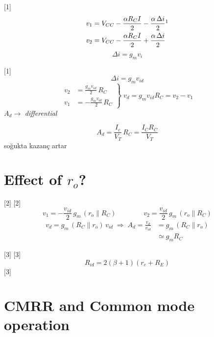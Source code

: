 \documentclass[11pt,a4paper]{article}
\begin{document}


[1]
\begin{align*}
v_1 &= V_{CC} - \frac{\alpha R_C I}{2} - \frac{\alpha\,\Delta i}{2}\footnotemark \\
v_2 &= V_{CC} - \frac{\alpha R_C I}{2} + \frac{\alpha\,\Delta i}{2}
\end{align*}
\[ \Delta i = g_m v_i \]

[1]
\[ \Delta i = g_m v_{id} \]
\[ \left.\begin{aligned} v_2 &= \frac{g_m v_{id}}{2}\,R_C \\ v_1 &= -\frac{g_m v_{id}}{2}\,R_C \end{aligned}\right\} \; v_d = g_m v_{id} R_C = v_2 - v_1 \]
$A_d \rightarrow$ \textit{differential}


\[ A_d = \frac{I_c}{V_T}\,R_C = \frac{I_C R_C}{V_T} \]
soğukta kazanç artar

\section{Effect of $r_o$?}
[2]
[2]
\[ v_1 = -\frac{v_{id}}{2}\,g_m\,(r_o \parallel R_C) \qquad\qquad v_2 = \frac{v_{id}}{2}\,g_m\,(r_o \parallel R_C) \]
\begin{align*}
v_d = g_m\,(R_C \parallel r_o)\,v_{id} \;\Rightarrow\; A_d = \frac{v_d}{v_{id}} &= g_m\,(R_C \parallel r_o) \\
&\simeq g_m R_C
\end{align*}

[3]
[3]
\[ R_{id} = 2(\beta + 1)(r_e + R_E) \]
[3]

\section{CMRR and Common mode operation}
\end{document}
